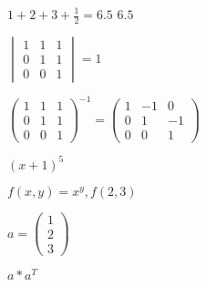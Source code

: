 $1+2+3+\frac{1}{2}=6.5$
$6.5$

$\begin{vmatrix}1&1&1\\0&1&1\\0&0&1\end{vmatrix}=1$

$\begin{pmatrix}1&1&1\\0&1&1\\0&0&1\end{pmatrix}^{-1}=\begin{pmatrix}
1 &-1 &0 \\
0 &1 &-1 \\
0 &0 &1
\end{pmatrix}$

$(x+1)^5$

$f(x,y)=x^y, f(2,3)$

$a=\begin{pmatrix}1\\2\\3\end{pmatrix}$

$a*a^T$



